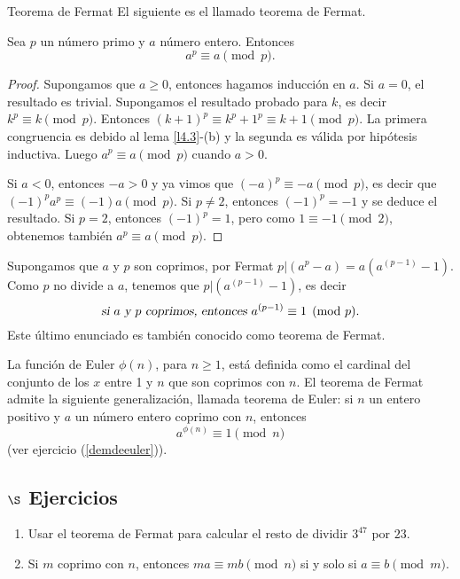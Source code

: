 \begin{section}{Teorema de Fermat}
El siguiente es el llamado teorema de Fermat.

\begin{teorema}\label{t4.3} Sea $p$ un número primo y $a$ número
entero. Entonces
$$
a^p\equiv a\pmod{p}.
$$
\end{teorema}
\begin{proof} Supongamos que $a\ge 0$, entonces hagamos
inducción en $a$. Si $a=0$, el resultado es trivial. Supongamos el
resultado probado para $k$, es decir $k^p \equiv k \pmod{p}$.
Entonces $(k+1)^p \equiv k^p +1^p \equiv k+1 \pmod{p}$. La primera
congruencia es debido al lema \ref{l4.3}-({b}) y la segunda es
válida por hipótesis inductiva. Luego $a^p\equiv a\pmod{p}$ cuando $a >0$.

Si $a<0$, entonces $-a>0$ y ya vimos que $(-a)^p \equiv -a
\pmod{p}$, es decir que $(-1)^pa^p \equiv (-1)a \pmod{p}$. Si
$p\not=2$, entonces $(-1)^p=-1$ y se deduce el resultado. Si
$p=2$, entonces $(-1)^p=1$, pero como $1\equiv -1 \pmod{2}$,
obtenemos también $a^p\equiv a\pmod{p}$.
\end{proof}


Supongamos que $a$ y $p$ son coprimos, por Fermat $p|(a^p
-a)=a(a^{(p-1)} -1)$. Como $p$ no divide a $a$, tenemos que
$p|(a^{(p-1)} -1)$, es decir 
$$
\text{\sl si $a$ y $p$ coprimos, entonces } a^{(p-1)}\equiv 1\pmod{p}.
$$
Este último enunciado es también conocido como teorema de Fermat.



La función de Euler   $\phi(n)$, para
$n\ge 1$, está definida como el cardinal del conjunto de los $x$
entre 1 y $n$ que son coprimos con $n$. El
teorema de Fermat admite la siguiente generalización, llamada
teorema de Euler:  si $n$ un entero
positivo y $a$ un número entero coprimo con $n$, entonces
$$
a^{\phi(n)} \equiv 1\pmod{n}
$$
(ver ejercicio (\ref{demdeeuler})).

\subsection*{\Large $\S$ Ejercicios}
\begin{enumerate}
\item Usar el teorema de Fermat para calcular el resto de dividir
$3^{47}$ por $23$.

\item Si $m$ coprimo con $n$, entonces $ma\equiv mb \pmod{n}$ si y solo
si $a\equiv b\pmod{m}$.


\end{enumerate}
\end{section}
